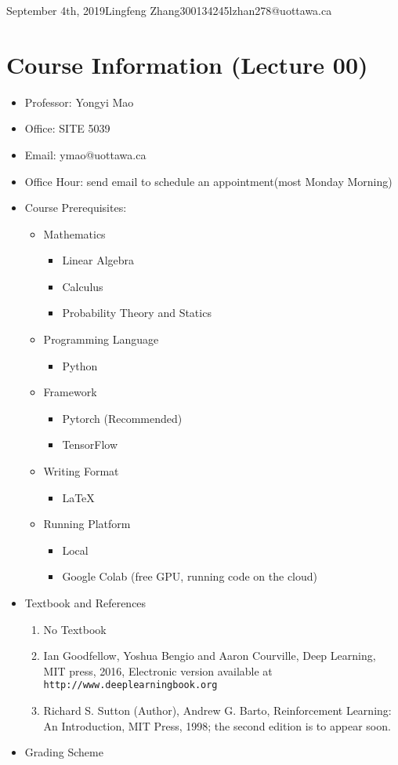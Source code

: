 \documentclass{article}
\begin{document}
\begin{lecture}{September 4th, 2019}{Lingfeng Zhang}{300134245}{lzhan278@uottawa.ca}

\section{Course Information (Lecture 00)}
\begin{itemize}
\item Professor: Yongyi Mao
\item Office: SITE 5039
\item Email: ymao@uottawa.ca
\item Office Hour: send email to schedule an appointment(most Monday Morning)
\item Course Prerequisites:
	\begin{itemize}
	\item Mathematics
		\begin{itemize}
		\item Linear Algebra
		\item Calculus
		\item Probability Theory and Statics
		\end{itemize}
	\item Programming Language
		\begin{itemize}
		\item Python
		\end{itemize}
	\item Framework
		\begin{itemize}
		\item Pytorch (Recommended)
		\item TensorFlow
		\end{itemize}
	\item Writing Format
		\begin{itemize}
		\item \LaTeX
		\end{itemize}
	\item Running Platform
		\begin{itemize}
		\item Local
		\item Google Colab (free GPU, running code on the cloud)
		\end{itemize}
	\end{itemize} 
\item Textbook and References
	\begin{enumerate}
	\item No Textbook
	\item Ian Goodfellow, Yoshua Bengio and Aaron Courville, Deep Learning, MIT press, 2016, Electronic version available at \newline \texttt{http://www.deeplearningbook.org}
	\item Richard S. Sutton (Author), Andrew G. Barto, Reinforcement Learning: An Introduction, MIT Press, 1998; the second edition is to appear soon.
	\end{enumerate}
	\item Grading Scheme
	

\end{itemize}
\end{lecture}
\end{document}
